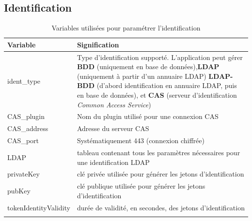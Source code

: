\subsection{Identification}
\begin{longtable}{|p{5cm}|p{8cm}|}
\hline
\textbf{Variable} & \textbf{Signification} \\
\hline
\endhead
ident\_type & Type d'identification supporté. L'application peut gérer \textbf{BDD} (uniquement en base de données),\textbf{LDAP} (uniquement à partir d'un annuaire LDAP) \textbf{LDAP-BDD} (d'abord identification en annuaire LDAP, puis en base de données), et \textbf{CAS} (serveur d'identification \textit{Common Access Service})\\
\hline
CAS\_plugin & Nom du plugin utilisé pour une connexion CAS \\
\hline
CAS\_address & Adresse du serveur CAS\\
\hline
CAS\_port & Systématiquement 443 (connexion chiffrée)\\
\hline
LDAP & tableau contenant tous les paramètres nécessaires pour une identification LDAP \\
\hline
privateKey & clé privée utilisée pour générer les jetons d'identification \\
\hline
pubKey & clé publique utilisée pour générer les jetons d'identification \\
\hline
tokenIdentityValidity & durée de validité, en secondes, des jetons d'identification\\
\hline
\caption{Variables utilisées pour paramétrer l'identification}
\end{longtable}


